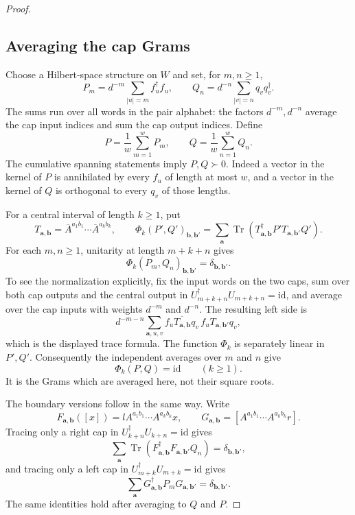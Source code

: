 \documentclass[11pt]{article}
\newcommand{\id}{\mathrm{id}}
\begin{document}
\begin{proof}
\subsection*{Averaging the cap Grams}

Choose a Hilbert-space structure on $W$ and set, for $m,n\geq1$,
\[
 P_m=d^{-m}\sum_{|u|=m}f_u^\dagger f_u,
 \qquad
 Q_n=d^{-n}\sum_{|v|=n}q_vq_v^\dagger.
\]
The sums run over all words in the pair alphabet: the factors
$d^{-m},d^{-n}$ average the cap input indices and sum the cap
output indices. Define
\[
 P=\frac1w\sum_{m=1}^wP_m,
 \qquad Q=\frac1w\sum_{n=1}^wQ_n.
\]
The cumulative spanning statements imply $P,Q\succ0$.
Indeed a vector in the kernel of $P$ is annihilated by every
$f_u$ of length at most $w$, and a vector in the kernel of $Q$
is orthogonal to every $q_v$ of those lengths.

For a central interval of length $k\geq1$, put
\[
 T_{\mathbf a,\mathbf b}
 =\overline A^{a_1b_1}\cdots\overline A^{a_kb_k},
 \qquad
 \Phi_k(P',Q')_{\mathbf b,\mathbf b'}
 =\sum_{\mathbf a}\operatorname{Tr}\!\left(
 T_{\mathbf a,\mathbf b}^\dagger P'
 T_{\mathbf a,\mathbf b'}Q'\right).
\]
For each $m,n\geq1$, unitarity at length $m+k+n$ gives
\[
 \Phi_k(P_m,Q_n)_{\mathbf b,\mathbf b'}
       =\delta_{\mathbf b,\mathbf b'}.
\]
To see the normalization explicitly, fix the input words on the
two caps, sum over both cap outputs and the central output in
$U_{m+k+n}^\dagger U_{m+k+n}=\id$, and average over the cap inputs
with weights $d^{-m}$ and $d^{-n}$. The resulting left side is
\[
 d^{-m-n}\sum_{\mathbf a,u,v}
 \overline{f_uT_{\mathbf a,\mathbf b}q_v}\,
              f_uT_{\mathbf a,\mathbf b'}q_v,
\]
which is the displayed trace formula.
The function $\Phi_k$ is separately linear in $P',Q'$.
Consequently the independent averages over $m$ and $n$ give
\[
 \Phi_k(P,Q)=\id\qquad(k\geq1).
\]
It is the Grams which are averaged here, not their square roots.

The boundary versions follow in the same way. Write
\[
 F_{\mathbf a,\mathbf b}([x])
   =lA^{a_1b_1}\cdots A^{a_kb_k}x,
 \qquad
 G_{\mathbf a,\mathbf b}
 =[A^{a_1b_1}\cdots A^{a_kb_k}r].
\]
Tracing only a right cap in $U_{k+n}^\dagger U_{k+n}=\id$ gives
\[
 \sum_{\mathbf a}\operatorname{Tr}\!\left(
 F_{\mathbf a,\mathbf b}^\dagger F_{\mathbf a,\mathbf b'}Q_n\right)
 =\delta_{\mathbf b,\mathbf b'},
\]
and tracing only a left cap in $U_{m+k}^\dagger U_{m+k}=\id$ gives
\[
 \sum_{\mathbf a}G_{\mathbf a,\mathbf b}^\dagger
                   P_mG_{\mathbf a,\mathbf b'}
 =\delta_{\mathbf b,\mathbf b'}.
\]
The same identities hold after averaging to $Q$ and $P$.


\end{proof}
\end{document}
